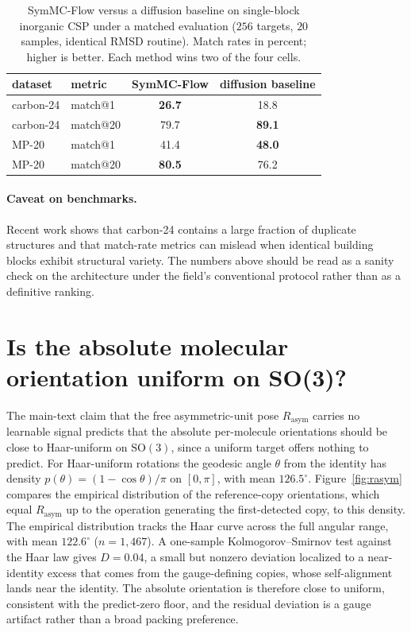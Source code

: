 \documentclass[11pt]{article}
\begin{document}
\begin{table}[h]
\centering
\caption{SymMC-Flow versus a diffusion baseline\cite{jiao2023diffcsp} on
single-block inorganic CSP under a matched evaluation ($256$ targets, $20$
samples, identical RMSD routine). Match rates in percent; higher is better. Each
method wins two of the four cells.}
\label{tab:inorganic}
\begin{tabular}{llcc}
\toprule
dataset & metric & SymMC-Flow & diffusion baseline \\
\midrule
carbon-24 & match@1  & \textbf{26.7} & 18.8 \\
carbon-24 & match@20 & 79.7 & \textbf{89.1} \\
MP-20     & match@1  & 41.4 & \textbf{48.0} \\
MP-20     & match@20 & \textbf{80.5} & 76.2 \\
\bottomrule
\end{tabular}
\end{table}

\paragraph{Caveat on benchmarks.} Recent work shows that carbon-24 contains a
large fraction of duplicate structures and that match-rate metrics can mislead
when identical building blocks exhibit structural
variety\cite{martirossyan2025matching}. The numbers above should be read as a
sanity check on the architecture under the field's conventional protocol rather
than as a definitive ranking.

\section{Is the absolute molecular orientation uniform on SO(3)?}

The main-text claim that the free asymmetric-unit pose $R_{\text{asym}}$ carries
no learnable signal predicts that the absolute per-molecule orientations should be
close to Haar-uniform on $\mathrm{SO}(3)$, since a uniform target offers nothing to
predict. For Haar-uniform rotations the geodesic angle $\theta$ from the identity
has density $p(\theta)=(1-\cos\theta)/\pi$ on $[0,\pi]$, with mean $126.5^\circ$.
Figure~\ref{fig:rasym} compares the empirical distribution of the reference-copy
orientations, which equal $R_{\text{asym}}$ up to the operation generating the
first-detected copy, to this density. The empirical distribution tracks the Haar
curve across the full angular range, with mean $122.6^\circ$ ($n=1{,}467$). A
one-sample Kolmogorov--Smirnov test against the Haar law gives $D=0.04$, a small
but nonzero deviation localized to a near-identity excess that comes from the
gauge-defining copies, whose self-alignment lands near the identity. The absolute
orientation is therefore close to uniform, consistent with the predict-zero floor,
and the residual deviation is a gauge artifact rather than a broad packing
preference.
\end{document}
